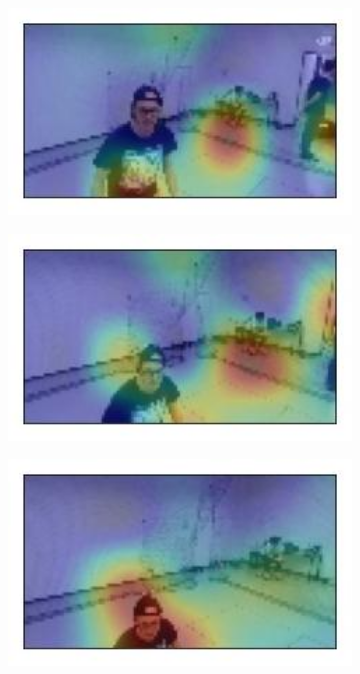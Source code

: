 \begin{figure}[!h]
	\begin{center}
		\begin{subfigure}[h]{0.24\textwidth}
			\centering
			\includegraphics[width=1\textwidth]{"contents/images/gradcam/gradcam-dario-1"}
		\end{subfigure}
		\hfill
		\begin{subfigure}[h]{0.24\textwidth}
			\centering
			\includegraphics[width=1\textwidth]{"contents/images/gradcam/gradcam-dario-2"}
		\end{subfigure}
		\hfill
		\begin{subfigure}[h]{0.24\textwidth}
			\centering
			\includegraphics[width=1\textwidth]{"contents/images/gradcam/gradcam-dario-3"}

\end{subfigure}
\end{center}
\end{figure}
